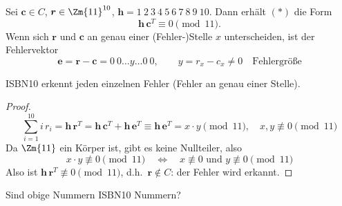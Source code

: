 Sei $\boldsymbol{c} \in C$, $\boldsymbol{r} \in \Zm{11}^{10}$, $\boldsymbol{h} = 1\ 2\ 3\ 4\ 5\ 6\ 7\ 8\ 9\ 10$. Dann erhält $(*)$ die Form
\[ \boldsymbol{h}\, \boldsymbol{c}^T \equiv 0 \pmod{11}. \]
Wenn sich $\boldsymbol{r}$ und $\boldsymbol{c}$ an genau einer (Fehler-)Stelle $x$ unterscheiden, ist der Fehlervektor
\[ \boldsymbol{e} = \boldsymbol{r} - \boldsymbol{c} = 0\ 0 \ldots y \ldots 0\ 0, \qquad y = r_x - c_x \neq 0 \quad \text{Fehlergröße} \]

\begin{satz}
ISBN10 erkennt jeden einzelnen Fehler (Fehler an genau einer Stelle).
\end{satz}

\begin{proof}
\[ \sum_{i=1}^{10} i\, r_i = \boldsymbol{h}\, \boldsymbol{r}^T = \boldsymbol{h}\, \boldsymbol{c}^T + \boldsymbol{h}\, \boldsymbol{e}^T \equiv \boldsymbol{h}\, \boldsymbol{e}^T = x \cdot y \pmod{11}, \quad x, y \not\equiv 0 \pmod{11} \]
Da $\Zm{11}$ ein Körper ist, gibt es keine Nullteiler, also
\[ x \cdot y \not\equiv 0 \pmod{11} \quad \Leftrightarrow \quad x \not\equiv 0 \text{ und } y \not\equiv 0 \pmod{11} \]
Also ist $\boldsymbol{h}\, \boldsymbol{r}^T \not\equiv 0 \pmod{11}$, d.h.\ $\boldsymbol{r} \notin C$: der Fehler wird erkannt.
\end{proof}

\begin{beispiel}
Sind obige Nummern ISBN10 Nummern?
\end{beispiel}
